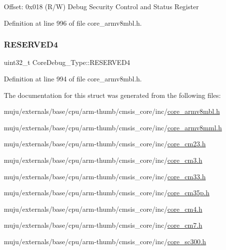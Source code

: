 Offset\+: 0x018 (R/W) Debug Security Control and Status Register 

Definition at line 996 of file core\+\_\+armv8mbl.\+h.

\mbox{\label{struct_core_debug___type_ac965e9b3abb1519676f2a6a959eaedb2}} 
\subsubsection{\texorpdfstring{R\+E\+S\+E\+R\+V\+E\+D4}{RESERVED4}}
{\footnotesize\ttfamily uint32\+\_\+t Core\+Debug\+\_\+\+Type\+::\+R\+E\+S\+E\+R\+V\+E\+D4}



Definition at line 994 of file core\+\_\+armv8mbl.\+h.



The documentation for this struct was generated from the following files\+:\begin{DoxyCompactItemize}
\item 
muju/externals/base/cpu/arm-\/thumb/cmsis\+\_\+core/inc/\hyperlink{core__armv8mbl_8h}{core\+\_\+armv8mbl.\+h}\item 
muju/externals/base/cpu/arm-\/thumb/cmsis\+\_\+core/inc/\hyperlink{core__armv8mml_8h}{core\+\_\+armv8mml.\+h}\item 
muju/externals/base/cpu/arm-\/thumb/cmsis\+\_\+core/inc/\hyperlink{core__cm23_8h}{core\+\_\+cm23.\+h}\item 
muju/externals/base/cpu/arm-\/thumb/cmsis\+\_\+core/inc/\hyperlink{core__cm3_8h}{core\+\_\+cm3.\+h}\item 
muju/externals/base/cpu/arm-\/thumb/cmsis\+\_\+core/inc/\hyperlink{core__cm33_8h}{core\+\_\+cm33.\+h}\item 
muju/externals/base/cpu/arm-\/thumb/cmsis\+\_\+core/inc/\hyperlink{core__cm35p_8h}{core\+\_\+cm35p.\+h}\item 
muju/externals/base/cpu/arm-\/thumb/cmsis\+\_\+core/inc/\hyperlink{core__cm4_8h}{core\+\_\+cm4.\+h}\item 
muju/externals/base/cpu/arm-\/thumb/cmsis\+\_\+core/inc/\hyperlink{core__cm7_8h}{core\+\_\+cm7.\+h}\item 
muju/externals/base/cpu/arm-\/thumb/cmsis\+\_\+core/inc/\hyperlink{core__sc300_8h}{core\+\_\+sc300.\+h}\end{DoxyCompactItemize}
